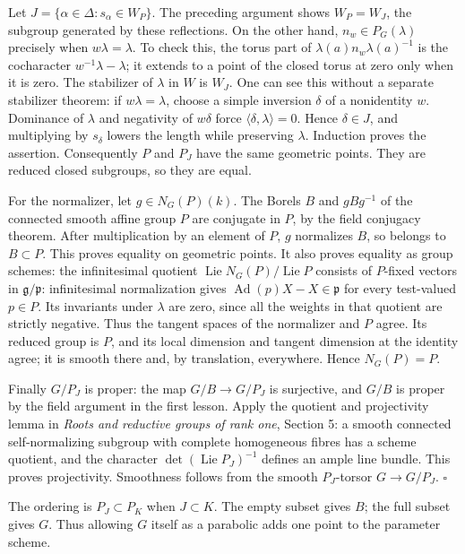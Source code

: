 \documentclass[11pt,a4paper,openany]{report}
\begin{document}
Let \(J=\{\alpha\in\Delta:s_\alpha\in W_P\}\). The preceding argument shows \(W_P=W_J\), the subgroup generated by these reflections. On the other hand, \(n_w\in P_G(\lambda)\) precisely when \(w\lambda=\lambda\). To check this, the torus part of \(\lambda(a)n_w\lambda(a)^{-1}\) is the cocharacter \(w^{-1}\lambda-\lambda\); it extends to a point of the closed torus at zero only when it is zero. The stabilizer of \(\lambda\) in \(W\) is \(W_J\). One can see this without a separate stabilizer theorem: if \(w\lambda=\lambda\), choose a simple inversion \(\delta\) of a nonidentity \(w\). Dominance of \(\lambda\) and negativity of \(w\delta\) force \(\langle\delta,\lambda\rangle=0\). Hence \(\delta\in J\), and multiplying by \(s_\delta\) lowers the length while preserving \(\lambda\). Induction proves the assertion. Consequently \(P\) and \(P_J\) have the same geometric points. They are reduced closed subgroups, so they are equal.

For the normalizer, let \(g\in N_G(P)(k)\). The Borels \(B\) and \(gBg^{-1}\) of the connected smooth affine group \(P\) are conjugate in \(P\), by the field conjugacy theorem. After multiplication by an element of \(P\), \(g\) normalizes \(B\), so belongs to \(B\subset P\). This proves equality on geometric points. It also proves equality as group schemes: the infinitesimal quotient \(\operatorname{Lie}N_G(P)/\operatorname{Lie}P\) consists of \(P\)-fixed vectors in \(\mathfrak g/\mathfrak p\): infinitesimal normalization gives \(\operatorname{Ad}(p)X-X\in\mathfrak p\) for every test-valued \(p\in P\). Its invariants under \(\lambda\) are zero, since all the weights in that quotient are strictly negative. Thus the tangent spaces of the normalizer and \(P\) agree. Its reduced group is \(P\), and its local dimension and tangent dimension at the identity agree; it is smooth there and, by translation, everywhere. Hence \(N_G(P)=P\).

Finally \(G/P_J\) is proper: the map \(G/B\to G/P_J\) is surjective, and \(G/B\) is proper by the field argument in the first lesson. Apply the quotient and projectivity lemma in \emph{Roots and reductive groups of rank one}, Section 5: a smooth connected self-normalizing subgroup with complete homogeneous fibres has a scheme quotient, and the character \(\det(\operatorname{Lie}P_J)^{-1}\) defines an ample line bundle. This proves projectivity. Smoothness follows from the smooth \(P_J\)-torsor \(G\to G/P_J\). \(\square\)

The ordering is \(P_J\subset P_K\) when \(J\subset K\). The empty subset gives \(B\); the full subset gives \(G\). Thus allowing \(G\) itself as a parabolic adds one point to the parameter scheme.
\end{document}
